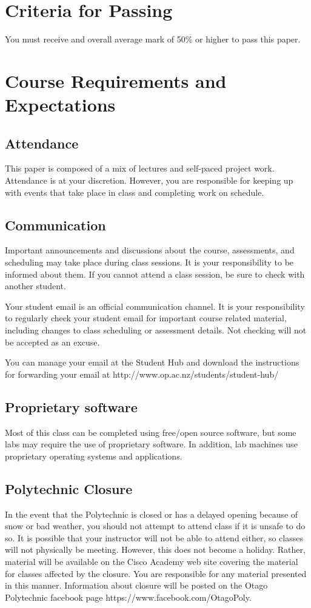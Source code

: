 \documentclass{article}
\begin{document}
\section*{Criteria for Passing}
You must receive and overall average mark of 50\% or higher to pass this paper.

\newpage

\section*{Course Requirements and Expectations}
\subsection*{Attendance}
This paper is composed of a mix of lectures and self-paced project work.  Attendance is at your discretion. 
However, you are responsible for keeping up with events that take place in class and completing work on schedule. 

\subsection*{Communication}
Important announcements and discussions about the course, assessments, and scheduling may take place during class sessions.  It is your responsibility to be informed about them.  If you cannot attend a class session, be sure to check with another student.

Your student email is an official communication channel. It is your responsibility to regularly check your student email for important course related material, including changes to class scheduling or assessment details. Not checking will not be accepted as an excuse.

You can manage your email at the Student Hub and download the instructions for forwarding your email at http://www.op.ac.nz/students/student-hub/

\subsection*{Proprietary software}
Most of this class can be completed using free/open source software, but some labs may require the use of proprietary software.  In addition, lab machines use proprietary operating systems and applications.

\subsection*{Polytechnic Closure}
In the event that the Polytechnic is closed or has a delayed opening because of snow or bad weather, you should not attempt to attend class if it is unsafe to do so. It is possible that your instructor will not be able to attend either, so classes will not physically be meeting. However, this does not become a holiday. Rather, material will be available on the Cisco Academy web site covering the material for classes affected by the closure. You are responsible for any material presented in this manner. Information about closure will be posted on the Otago Polytechnic facebook page https://www.facebook.com/OtagoPoly.
\end{document}
